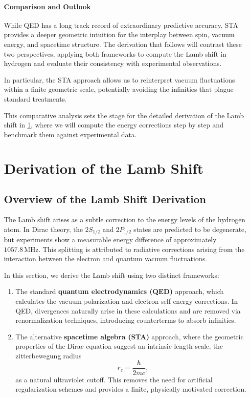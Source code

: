 \documentclass[12pt]{article}
\begin{document}
\paragraph{Comparison and Outlook}
While QED has a long track record of extraordinary predictive accuracy, STA provides a deeper geometric intuition for the interplay between spin, vacuum energy, and spacetime structure. The derivation that follows will contrast these two perspectives, applying both frameworks to compute the Lamb shift in hydrogen and evaluate their consistency with experimental observations.

In particular, the STA approach allows us to reinterpret vacuum fluctuations within a finite geometric scale, potentially avoiding the infinities that plague standard treatments.

This comparative analysis sets the stage for the detailed derivation of the Lamb shift in \ref{sec:derive_lamb_shift}, where we will compute the energy corrections step by step and benchmark them against experimental data.

\section{Derivation of the Lamb Shift}\label{sec:derive_lamb_shift}

\subsection{Overview of the Lamb Shift Derivation}\label{subsec:lamb_overview}

The Lamb shift arises as a subtle correction to the energy levels of the hydrogen atom. In Dirac theory, the \(2S_{1/2}\) and \(2P_{1/2}\) states are predicted to be degenerate, but experiments show a measurable energy difference of approximately \(1057.8\,\mathrm{MHz}\). This splitting is attributed to radiative corrections arising from the interaction between the electron and quantum vacuum fluctuations.

In this section, we derive the Lamb shift using two distinct frameworks: 
\begin{enumerate}
    \item The standard \textbf{quantum electrodynamics (QED)} approach, which calculates the vacuum polarization and electron self-energy corrections. In QED, divergences naturally arise in these calculations and are removed via renormalization techniques, introducing counterterms to absorb infinities.
    \item The alternative \textbf{spacetime algebra (STA)} approach, where the geometric properties of the Dirac equation suggest an intrinsic length scale, the zitterbewegung radius
    \[
    r_z = \frac{\hbar}{2mc},
    \]
    as a natural ultraviolet cutoff. This removes the need for artificial regularization schemes and provides a finite, physically motivated correction.
\end{enumerate}
\end{document}
